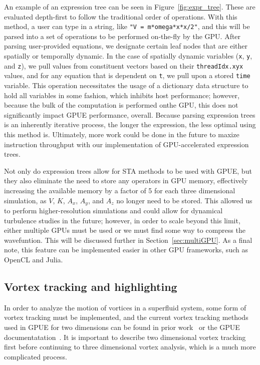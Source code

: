 An example of an expression tree can be seen in Figure~\ref{fig:expr_tree}.
These are evaluated depth-first to follow the traditional order of operations.
With this method, a user can type in a string, like \texttt{"V = m*omega*x*x/2"}, and this will be parsed into a set of operations to be performed on-the-fly by the GPU.
After parsing user-provided equations, we designate certain leaf nodes that are either spatially or temporally dynamic.
In the case of spatially dynamic variables (\texttt{x}, \texttt{y}, and \texttt{z}), we pull values from constituent vectors based on their \texttt{threadIdx.xyx} values, and for any equation that is dependent on \texttt{t}, we pull upon a stored \texttt{time} variable.
This operation necessitates the usage of a dictionary data structure to hold all variables in some fashion, which inhibits host performance; however, because the bulk of the computation is performed onthe GPU, this does not significantly impact GPUE performance, overall.
Because parsing expression trees is an inherently iterative process, the longer the expression, the less optimal using this method is.
Ultimately, more work could be done in the future to maxize instruction throughput with our implementation of GPU-accelerated expression trees.

Not only do expression trees allow for STA methods to be used with GPUE, but they also eliminate the need to store any operators in GPU memory, effectively increasing the available memory by a factor of 5 for each three dimensional simulation, as $V$, $K$, $A_x$, $A_y$, and $A_z$ no longer need to be stored.
This allowed us to perform higher-resolution simulations and could allow for dynamical turbulence studies in the future; however, in order to scale beyond this limit, either multiple GPUs must be used or we must find some way to compress the wavefuntion.
This will be discussed further in Section~\ref{sec:multiGPU}.
As a final note, this feature can be implemented easier in other GPU frameworks, such as OpenCL and Julia.

\subsection{Vortex tracking and highlighting}
\label{sec:tracking}

In order to analyze the motion of vortices in a superfluid system, some form of vortex tracking must be implemented, and the current vortex tracking methods used in GPUE for two dimensions can be found in prior work~\cite{o2017} or the GPUE documentatation~\cite{docs}.
It is important to describe two dimensional vortex tracking first before continuing to three dimensional vortex analysis, which is a much more complicated process.

